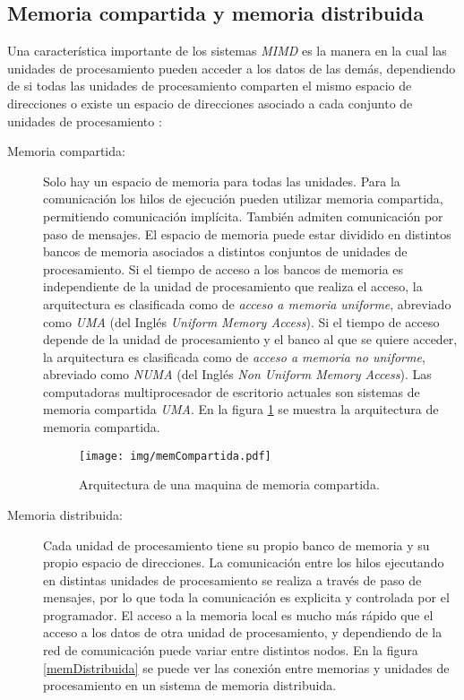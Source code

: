 \subsection{Memoria compartida y memoria distribuida}

Una característica importante de los sistemas \emph{MIMD} es la manera en la
cual las unidades de procesamiento pueden acceder a los datos de las demás,
dependiendo de si todas las unidades de procesamiento comparten el mismo espacio
de direcciones o existe un espacio de direcciones asociado a cada conjunto de
unidades de procesamiento \cite{introToPC2002, anIntroToPP2011}:

\begin{description}

	\item[Memoria compartida:] Solo hay un espacio de memoria para todas las
		unidades. Para la comunicación los hilos de ejecución pueden
		utilizar memoria compartida, permitiendo comunicación
		implícita. También admiten comunicación por paso de mensajes. El
		espacio de memoria puede estar dividido en distintos bancos de
		memoria asociados a distintos conjuntos de unidades de
		procesamiento. Si el tiempo de acceso a los bancos de memoria es
		independiente de la unidad de procesamiento que realiza el
		acceso, la arquitectura es clasificada como de \emph{acceso a
		memoria uniforme}, abreviado como \emph{UMA} (del Inglés
		\emph{Uniform Memory Access}). Si el tiempo de acceso depende de
		la unidad de procesamiento y el banco al que se quiere acceder,
		la arquitectura es clasificada como de \emph{acceso a memoria no
		uniforme}, abreviado como \emph{NUMA} (del Inglés \emph{Non
		Uniform Memory Access}). Las computadoras multiprocesador de
		escritorio actuales son sistemas de memoria compartida
		\emph{UMA}. En la figura \ref{memCompartida} se muestra la
		arquitectura de memoria compartida.

\begin{figure}[!htb]

	\centering
	\texttt{[image: img/memCompartida.pdf]}
	\caption{Arquitectura de una maquina de memoria compartida.}

	\label{memCompartida}

\end{figure}

	\item[Memoria distribuida:] Cada unidad de procesamiento tiene su propio
		banco de memoria y su propio espacio de direcciones. La
		comunicación entre los hilos ejecutando en distintas unidades de
		procesamiento se realiza a través de paso de mensajes, por lo
		que toda la comunicación es explicita y controlada por el
		programador. El acceso a la memoria local es mucho más rápido
		que el acceso a los datos de otra unidad de procesamiento, y
		dependiendo de la red de comunicación puede variar entre
		distintos nodos. En la figura \ref{memDistribuida} se puede ver
		las conexión entre memorias y unidades de procesamiento en un
		sistema de memoria distribuida.


\end{description}
